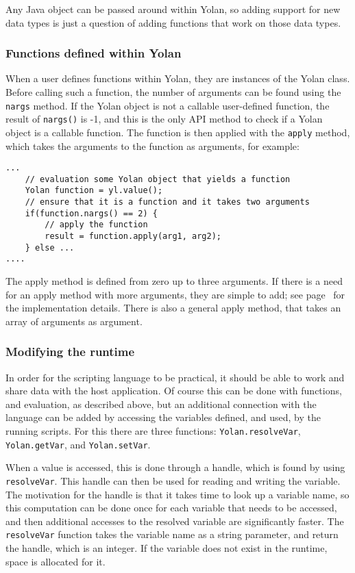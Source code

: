 \documentclass[11pt]{report}
\begin{document}
Any Java object can be passed around within Yolan, so adding support for new data types is just a question of adding functions that work on those data types.

\subsubsection{Functions defined within Yolan}
When a user defines functions within Yolan, they are instances of the Yolan class. 
Before calling such a function, the number of arguments can be found using the \verb|nargs| method.
If the Yolan object is not a callable user-defined function, the result of \verb|nargs()| is -1, and this is the only API method to check if a Yolan object is a callable function.
The function is then applied with the \verb|apply| method, which takes the arguments to the function as arguments, for example:
\begin{lstlisting}
...
    // evaluation some Yolan object that yields a function
    Yolan function = yl.value();
    // ensure that it is a function and it takes two arguments
    if(function.nargs() == 2) {
        // apply the function 
        result = function.apply(arg1, arg2);
    } else ...
....
\end{lstlisting}
The apply method is defined from zero up to three arguments. If there is a need for an apply method with more arguments, they are simple to add; see page~\pageref{source-yolan-apply} for the implementation details. There is also a general apply method, that takes an array of arguments as argument.

\subsubsection{Modifying the runtime}

In order for the scripting language to be practical, it should be able to work and share data with the host application. 
Of course this can be done with functions, and evaluation, as described above, but an additional connection with the language can be added by accessing the variables defined, and used, by the running scripts.
For this there are three functions: \verb|Yolan.resolveVar|, \verb|Yolan.getVar|, and \verb|Yolan.setVar|.

When a value is accessed, this is done through a handle, which is found by using \verb|resolveVar|. This handle can then be used for reading and writing the variable. The motivation for the handle is that it takes time to look up a variable name, so this computation can be done once for each variable that needs to be accessed, and then additional accesses to the resolved variable are significantly faster. The \verb|resolveVar| function takes the variable name as a string parameter, and return the handle, which is an integer. If the variable does not exist in the runtime, space is allocated for it.
\end{document}
